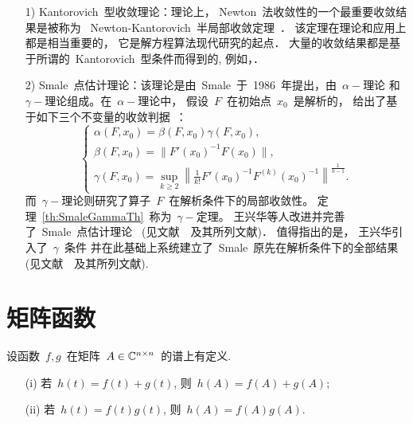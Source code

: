 \begin{itemize}
\item[1)]
Kantorovich~型收敛理论：理论上，
Newton~法收敛性的一个最重要收敛结果是被称为
~Newton-Kantorovich~半局部收敛定理~\cite{Kantorvich1982}．
该定理在理论和应用上都是相当重要的， 它是解方程算法现代研究的起点．
大量的收敛结果都是基于所谓的~Kantorovich~型条件而得到的,
例如，\cite{Ortega1970,Rokne1972,Rall1974,GraggTapia1974,Deuflhard1979,
Ypma1982,Huang1993,Gutierrez1997a,Wang1999,Gutierrez2000,Ezquerro2002}．

\item[2)]
Smale~点估计理论：该理论是由~Smale~于~1986~年提出，由~$\alpha-$理论
和~$\gamma-$理论组成。在~$\alpha-$理论中，
假设~$F$~在初始点~$x_0$~是解析的，
给出了基于如下三个不变量的收敛判据~\cite{Smale1986}：
\begin{equation*}
\begin{cases}
\alpha(F,x_0) = \beta(F,x_0)\gamma(F,x_0),\\
\beta(F,x_0) = \|F'(x_0)^{-1}F(x_0)\|,\\
\gamma(F,x_0) = \sup\limits_{k \geqslant 2} \left\|\displaystyle
\frac{1}{k!} F'(x_0)^{-1}F^{(k)}(x_0)^{-1}\right\|^{\frac{1}{k-1}}.
\end{cases}
\end{equation*}
而~$\gamma-$理论则研究了算子~$F$~在解析条件下的局部收敛性。
定理~\ref{th:SmaleGammaTh}~称为~$\gamma-$定理。
王兴华等人改进并完善了~Smale~点估计理论
~(见文献~\cite{WangLi2001}~及其所列文献)． 值得指出的是，
王兴华引入了~$\gamma$~条件
并在此基础上系统建立了~Smale~原先在解析条件下的全部结果
(见文献~\cite{WangHan1997b}~及其所列文献).
\end{itemize}






\section{矩阵函数}


\begin{theorem}
\label{th:MatFun_sum_product} 设函数~$f,g$~在矩阵~$A\in\mathbb{C}^{n\times
n}$~的谱上有定义.
\begin{enumerate}
\item[\textup{(i)}]
若~$h(t) = f(t) + g(t)$, 则~$h(A) = f(A)+g(A)$;
\item[\textup{(ii)}]
若~$h(t)=f(t)g(t)$, 则~$h(A)=f(A)g(A)$.
\end{enumerate}
\end{theorem}






